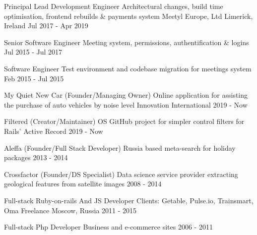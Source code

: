 
\begin{cventries}

  \cvblitz
    {Principal Lead Development Engineer} %
    {Architectural changes, build time optimisation, frontend rebuilds \& payments system}
    {Meetyl Europe, Ltd} %
    {Limerick, Ireland} %
    {Jul 2017 - Apr 2019} %

    \cvblitz
    {Senior Software Engineer} %
    {Meeting system, permissions, authentification \& logins} %
    {} %
    {} %
    {Jul 2015 - Jul 2017} %

    \cvblitz
    {Software Engineer} %
    {Test environment and codebase migration for meetings system} %
    {} %
    {} %
    {Feb 2015 - Jul 2015} %

  \cvblitz
    {My Quiet New Car (Founder/Managing Owner)} %
    {Online application for assisting the purchase of auto vehicles by noise level} %
    {Innovation} %
    {International} %
    {2019 - Now} %

    \cvblitz
    {Filtered (Creator/Maintainer)} %
    {OS GitHub project for simpler control filters for Rails’ Active Record} %
    {} %
    {} %
    {2019 - Now} %

    \cvblitz
    {Aleffa (Founder/Full Stack Developer)} %
    {Russia based meta-search for holiday packages} %
    {} %
    {} %
    {2013 - 2014} %

    \cvblitz
    {Crossfactor (Founder/DS Specialist)} %
    {Data science service provider extracting geological features from satellite images} %
    {} %
    {} %
    {2008 - 2014} %

  \cvblitz
    {Full-stack Ruby-on-rails And JS Developer} %
    {Clients: Getable, Pulse.io, Trainsmart, Oma} %
    {Freelance} %
    {Moscow, Russia} %
    {2011 - 2015} %

    \cvblitz
    {Full-stack Php Developer} %
    {Business and e-commerce sites} %
    {} %
    {} %
    {2006 - 2011} %

\end{cventries}
